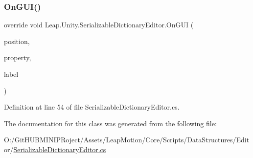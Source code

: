 \subsubsection{\texorpdfstring{OnGUI()}{OnGUI()}}
{\footnotesize\ttfamily override void Leap.\+Unity.\+Serializable\+Dictionary\+Editor.\+On\+G\+UI (\begin{DoxyParamCaption}\item[{Rect}]{position,  }\item[{Serialized\+Property}]{property,  }\item[{G\+U\+I\+Content}]{label }\end{DoxyParamCaption})}



Definition at line 54 of file Serializable\+Dictionary\+Editor.\+cs.



The documentation for this class was generated from the following file\+:\begin{DoxyCompactItemize}
\item 
O\+:/\+Git\+H\+U\+B\+M\+I\+N\+I\+P\+Roject/\+Assets/\+Leap\+Motion/\+Core/\+Scripts/\+Data\+Structures/\+Editor/\mbox{\hyperlink{_serializable_dictionary_editor_8cs}{Serializable\+Dictionary\+Editor.\+cs}}\end{DoxyCompactItemize}

